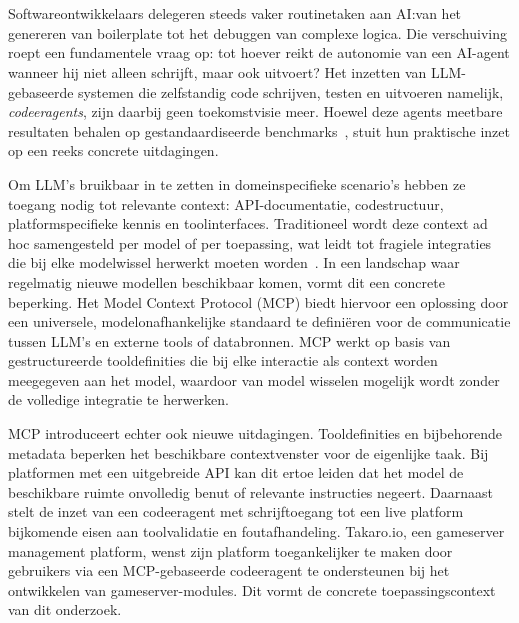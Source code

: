 
\chapter{}%
\label{ch:inleiding}

Softwareontwikkelaars delegeren steeds vaker routinetaken aan AI:\@ van het genereren van boilerplate tot het debuggen van complexe logica. Die verschuiving roept een fundamentele vraag op: tot hoever reikt de autonomie van een AI-agent wanneer hij niet alleen schrijft, maar ook uitvoert? Het inzetten van LLM-gebaseerde systemen die zelfstandig code schrijven, testen en uitvoeren namelijk, \textit{codeeragents}, zijn daarbij geen toekomstvisie meer. Hoewel deze agents meetbare resultaten behalen op gestandaardiseerde benchmarks~\cite{scale_swebench_pro}, stuit hun praktische inzet op een reeks concrete uitdagingen.

Om LLM's bruikbaar in te zetten in domeinspecifieke scenario's  hebben ze toegang nodig tot relevante context: API-documentatie, codestructuur, platformspecifieke kennis en toolinterfaces. Traditioneel wordt deze context ad hoc samengesteld per model of per toepassing, wat leidt tot fragiele integraties die bij elke modelwissel herwerkt moeten worden~\cite{Sekar2026MCP}. In een landschap waar regelmatig nieuwe modellen beschikbaar komen, vormt dit een concrete beperking. Het Model Context Protocol (MCP) biedt hiervoor een oplossing door een universele, modelonafhankelijke standaard te definiëren voor de communicatie tussen LLM's en externe tools of databronnen. MCP werkt op basis van gestructureerde tooldefinities die bij elke interactie als context worden meegegeven aan het model, waardoor van model wisselen mogelijk wordt zonder de volledige integratie te herwerken.

MCP introduceert echter ook nieuwe uitdagingen. Tooldefinities en bijbehorende metadata beperken het beschikbare contextvenster voor de eigenlijke taak. Bij platformen met een uitgebreide API kan dit ertoe leiden dat het model de beschikbare ruimte onvolledig benut of relevante instructies negeert. Daarnaast stelt de inzet van een codeeragent met schrijftoegang tot een live platform bijkomende eisen aan toolvalidatie en foutafhandeling. Takaro.io, een gameserver management platform, wenst zijn platform toegankelijker te maken door gebruikers via een MCP-gebaseerde codeeragent te ondersteunen bij het ontwikkelen van gameserver-modules. Dit vormt de concrete toepassingscontext van dit onderzoek.

